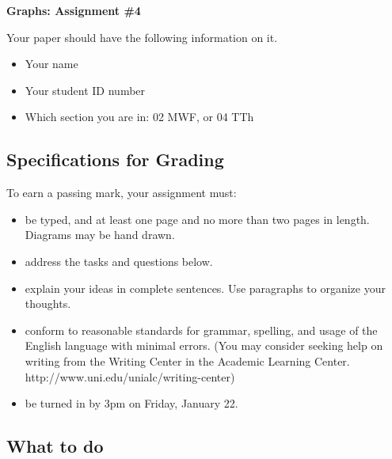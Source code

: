 \documentclass[12pt,letterpaper]{article}
\theoremstyle{definition}
\begin{document}
\setlength{\parskip}{1ex plus 0.5ex minus 0.2ex}
\setlength{\parindent}{0pt}

\pagestyle{fancy}
\lfoot{} 
\rfoot{} 

\begin{center}
{
\Large
\textbf{Graphs: Assignment \#4}
}
\end{center}

Your paper should have the following information on it.
\begin{itemize}
\item Your name
\item Your student ID number 
\item Which section you are in: 02 MWF, or 04 TTh
\end{itemize}


\subsection*{Specifications for Grading}

To earn a passing mark, your assignment must:
\begin{itemize}
\item be typed, and at least one page and no more than two pages in length. Diagrams may be hand drawn.
\item address the tasks and questions below.
\item explain your ideas in complete sentences. Use paragraphs to organize your thoughts.
\item conform to reasonable standards for grammar, spelling, and usage of the English language with minimal errors. (You may consider seeking help on writing from the Writing Center in the Academic Learning Center. http://www.uni.edu/unialc/writing-center)
\item be turned in by 3pm on Friday, January 22.
\end{itemize}



\subsection*{What to do}
\end{document}
